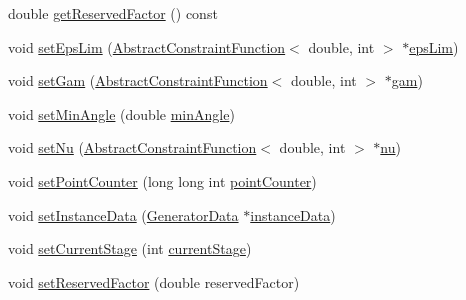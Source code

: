 \begin{DoxyCompactItemize}
double \hyperlink{class_abstract_object_c_c_o_tree_a1003fc21c6c57a304a5c3c21e03874c4}{get\+Reserved\+Factor} () const 
\item 
void \hyperlink{class_abstract_object_c_c_o_tree_aad766c18effb679595d7c2fbae12006a}{set\+Eps\+Lim} (\hyperlink{class_abstract_constraint_function}{Abstract\+Constraint\+Function}$<$ double, int $>$ $\ast$\hyperlink{class_abstract_object_c_c_o_tree_a62d3e1ff7e74a6236422273f58fc6012}{eps\+Lim})
\item 
void \hyperlink{class_abstract_object_c_c_o_tree_a0d5c2d87afe1bff8f5e2e2bb25baccde}{set\+Gam} (\hyperlink{class_abstract_constraint_function}{Abstract\+Constraint\+Function}$<$ double, int $>$ $\ast$\hyperlink{class_abstract_object_c_c_o_tree_aad315b93744637e18153c4434dac067d}{gam})
\item 
void \hyperlink{class_abstract_object_c_c_o_tree_a368a31e807df983b8556d6caa65dfef9}{set\+Min\+Angle} (double \hyperlink{class_abstract_object_c_c_o_tree_a254b7d92f417613be6019031a0afb63d}{min\+Angle})
\item 
void \hyperlink{class_abstract_object_c_c_o_tree_a5c697dca9b49016e8dddc1af43cf0d20}{set\+Nu} (\hyperlink{class_abstract_constraint_function}{Abstract\+Constraint\+Function}$<$ double, int $>$ $\ast$\hyperlink{class_abstract_object_c_c_o_tree_a92e6b6d1a2fac7331eee34fb28158828}{nu})
\item 
void \hyperlink{class_abstract_object_c_c_o_tree_a53deb35aacf40244e396772bc151b3c3}{set\+Point\+Counter} (long long int \hyperlink{class_abstract_object_c_c_o_tree_a8d8512b976d31017c242e229dafebd0a}{point\+Counter})
\item 
void \hyperlink{class_abstract_object_c_c_o_tree_ab0422503ddc24447e752c73d20a51887}{set\+Instance\+Data} (\hyperlink{class_generator_data}{Generator\+Data} $\ast$\hyperlink{class_abstract_object_c_c_o_tree_aca7aecbd89dadc46dd9dce14cfde31e1}{instance\+Data})
\item 
void \hyperlink{class_abstract_object_c_c_o_tree_aa7e666d1d2736f69aae81e24481497db}{set\+Current\+Stage} (int \hyperlink{class_abstract_object_c_c_o_tree_a3597fe2e3dd70d3da743674eb91c2831}{current\+Stage})
\item 
void \hyperlink{class_abstract_object_c_c_o_tree_aa88bb0f5894cad8b52d6a93b57355b52}{set\+Reserved\+Factor} (double reserved\+Factor)
\end{DoxyCompactItemize}
